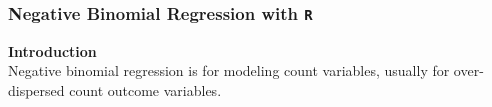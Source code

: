 \documentclass[MASTER.tex]{subfiles}
\begin{document}
	

\begin{frame}[fragile]
\frametitle{Negative Binomial Regression with \texttt{R} }
\Large

\textbf{Introduction}\\ 
Negative binomial regression is for modeling count variables, usually for over-dispersed count outcome variables.

\end{frame}


	
\end{document}
